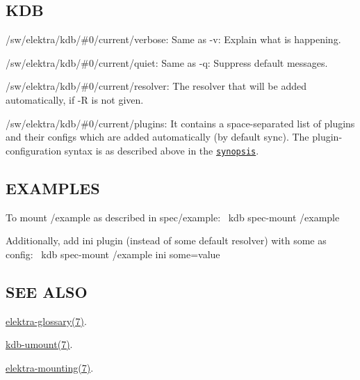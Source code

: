 \subsection*{K\+DB}


\begin{DoxyItemize}
\item {\ttfamily /sw/elektra/kdb/\#0/current/verbose}\+: Same as {\ttfamily -\/v}\+: Explain what is happening.
\item {\ttfamily /sw/elektra/kdb/\#0/current/quiet}\+: Same as {\ttfamily -\/q}\+: Suppress default messages.
\item {\ttfamily /sw/elektra/kdb/\#0/current/resolver}\+: The resolver that will be added automatically, if {\ttfamily -\/R} is not given.
\item {\ttfamily /sw/elektra/kdb/\#0/current/plugins}\+: It contains a space-\/separated list of plugins and their configs which are added automatically (by default sync). The plugin-\/configuration syntax is as described above in the \href{#SYNOPSIS}{\tt synopsis}.
\end{DoxyItemize}

\subsection*{E\+X\+A\+M\+P\+L\+ES}

To mount /example as described in {\ttfamily spec/example}\+:~\newline
 {\ttfamily kdb spec-\/mount /example}

Additionally, add {\ttfamily ini} plugin (instead of some default resolver) with {\ttfamily some} as config\+:~\newline
 {\ttfamily kdb spec-\/mount /example ini some=value}

\subsection*{S\+EE A\+L\+SO}


\begin{DoxyItemize}
\item \hyperlink{md_doc_help_elektra-glossary_doc_help_elektra-glossary_md}{elektra-\/glossary(7)}.
\item \hyperlink{md_doc_help_kdb-umount_doc_help_kdb-umount_md}{kdb-\/umount(7)}.
\item \hyperlink{md_doc_help_elektra-mounting_doc_help_elektra-mounting_md}{elektra-\/mounting(7)}. 
\end{DoxyItemize}